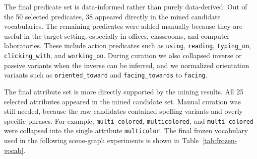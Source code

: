 The final predicate set is data-informed rather than purely data-derived. Out of the 50 selected predicates, 38 appeared directly in the mined candidate vocabularies. The remaining predicates were added manually because they are useful in the target setting, especially in offices, classrooms, and computer laboratories. These include action predicates such as \texttt{using}, \texttt{reading}, \texttt{typing\_on}, \texttt{clicking\_with}, and \texttt{working\_on}. During curation we also collapsed inverse or passive variants when the inverse can be inferred, and we normalized orientation variants such as \texttt{oriented\_toward} and \texttt{facing\_towards} to \texttt{facing}.

The final attribute set is more directly supported by the mining results. All 25 selected attributes appeared in the mined candidate set. Manual curation was still needed, because the raw candidates contained spelling variants and overly specific phrases. For example, \texttt{multi\_colored}, \texttt{multicolored}, and \texttt{multi-colored} were collapsed into the single attribute \texttt{multicolor}. The final frozen vocabulary used in the following scene-graph experiments is shown in Table~\ref{tab:frozen-vocab}.

